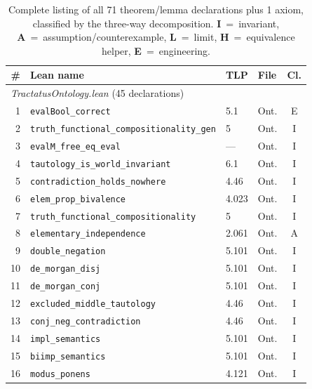 \documentclass[10pt, letterpaper]{article}
\theoremstyle{definition}
\theoremstyle{remark}
\begin{document}
\begin{table}[p]
\centering
\footnotesize
\caption{Complete listing of all 71 theorem/lemma declarations
  plus 1 axiom, classified by the three-way decomposition.
  \textbf{I}~=~invariant, \textbf{A}~=~assumption/counterexample,
  \textbf{L}~=~limit, \textbf{H}~=~equivalence helper,
  \textbf{E}~=~engineering.}
\label{tab:decomposition}
\begin{tabular}{@{}rlllc@{}}
\toprule
\# & \textbf{Lean name} & \textbf{TLP} & \textbf{File} & \textbf{Cl.} \\
\midrule
\multicolumn{5}{l}{\emph{TractatusOntology.lean} (45 declarations)} \\
\midrule
 1 & \texttt{evalBool\_correct}                        & 5.1     & Ont. & E \\
 2 & \texttt{truth\_functional\_compositionality\_gen}  & 5       & Ont. & I \\
 3 & \texttt{evalM\_free\_eq\_eval}                     & ---     & Ont. & I \\
 4 & \texttt{tautology\_is\_world\_invariant}            & 6.1     & Ont. & I \\
 5 & \texttt{contradiction\_holds\_nowhere}              & 4.46    & Ont. & I \\
 6 & \texttt{elem\_prop\_bivalence}                      & 4.023   & Ont. & I \\
 7 & \texttt{truth\_functional\_compositionality}        & 5       & Ont. & I \\
 8 & \texttt{elementary\_independence}                   & 2.061   & Ont. & A \\
 9 & \texttt{double\_negation}                           & 5.101   & Ont. & I \\
10 & \texttt{de\_morgan\_disj}                           & 5.101   & Ont. & I \\
11 & \texttt{de\_morgan\_conj}                           & 5.101   & Ont. & I \\
12 & \texttt{excluded\_middle\_tautology}                & 4.46    & Ont. & I \\
13 & \texttt{conj\_neg\_contradiction}                   & 4.46    & Ont. & I \\
14 & \texttt{impl\_semantics}                            & 5.101   & Ont. & I \\
15 & \texttt{biimp\_semantics}                           & 5.101   & Ont. & I \\
16 & \texttt{modus\_ponens}                              & 4.121   & Ont. & I \\

\end{tabular}
\end{table}
\end{document}
